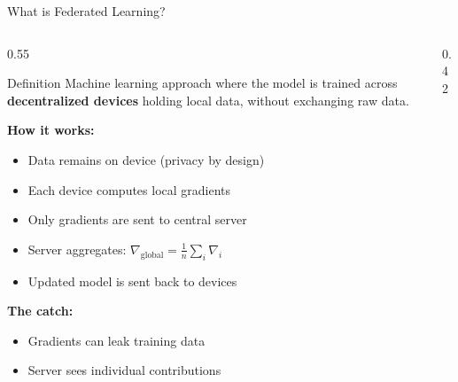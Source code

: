 \documentclass[aspectratio=169,10pt]{beamer}
\begin{document}
\begin{frame}{What is Federated Learning?}
    \begin{columns}[T]
        \begin{column}{0.55\textwidth}
            \begin{block}{Definition}
                Machine learning approach where the model is trained across \textbf{decentralized devices} holding local data, without exchanging raw data.
            \end{block}

            \vspace{0.4em}
            \textbf{How it works:}
            \begin{itemize}
                \item Data remains on device (privacy by design)
                \item Each device computes local gradients
                \item Only gradients are sent to central server
                \item Server aggregates: $\nabla_{\text{global}} = \frac{1}{n}\sum_i \nabla_i$
                \item Updated model is sent back to devices
            \end{itemize}

            \vspace{0.4em}
            \textbf{The catch:}
            \begin{itemize}
                \item Gradients can leak training data
                \item Server sees individual contributions
            \end{itemize}
        \end{column}
        \begin{column}{0.42\textwidth}
\end{column}
\end{columns}
\end{frame}
\end{document}
